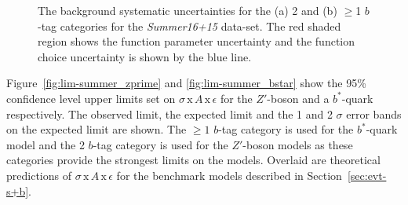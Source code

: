 \begin{figure}[!ht]
  \begin{center}
    \captionsetup[subfigure]{aboveskip=0pt,justification=centering}
  \end{center}
  \caption{The background systematic uncertainties for the (a) 2 and (b) $\geq$1 $b$-tag categories
    for the \textit{Summer16+15} data-set.
    The red shaded region shows the function parameter uncertainty and the
    function choice uncertainty is shown by the blue line. }
  \label{fig:lim-summer_systBkg}
\end{figure}

Figure~\ref{fig:lim-summer_zprime} and \ref{fig:lim-summer_bstar} show the
95\% confidence level upper limits set on $\sigma\,\text{x}\,\mathit{A}\,\text{x}\,\epsilon$
for the $Z'$-boson and a $b^*$-quark respectively.
The observed limit, the expected limit and the 1 and 2 $\sigma$ error bands on the expected limit are shown.
The $\geq1$ $b$-tag category is used for the $b^*$-quark model
and the 2 $b$-tag category is used for the $Z'$-boson models
as these categories provide the strongest limits on the models.
Overlaid are theoretical predictions of
$\sigma\,\text{x}\,\mathit{A}\,\text{x}\,\epsilon$ for the benchmark models described in Section~\ref{sec:evt-s+b}.



